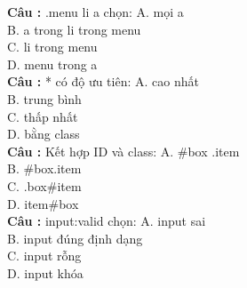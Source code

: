 \documentclass[12pt,a4paper]{article}
\begin{document}
\textbf{Câu :} .menu li a chọn:
A. mọi a \\
B. a trong li trong menu \\
C. li trong menu \\
D. menu trong a \\

\textbf{Câu :} * có độ ưu tiên:
A. cao nhất \\
B. trung bình \\
C. thấp nhất \\
D. bằng class \\

\textbf{Câu :} Kết hợp ID và class:
A. \#box .item \\
B. \#box.item \\
C. .box\#item \\
D. item\#box \\

\textbf{Câu :} input:valid chọn:
A. input sai \\
B. input đúng định dạng \\
C. input rỗng \\
D. input khóa \\
\end{document}
